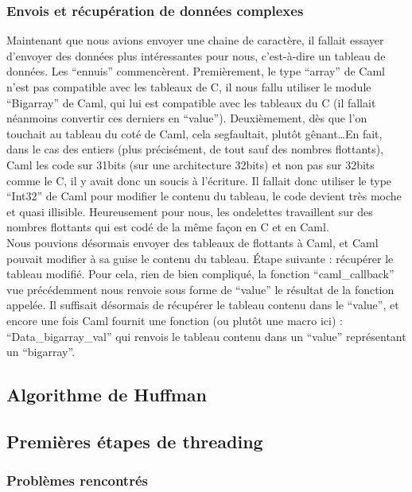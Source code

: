 \documentclass[a4paper,12pt]{article}
\begin{document}
		\subsubsection{Envois et récupération de données complexes}
Maintenant que nous avions envoyer  une chaine de caractère,  il fallait
essayer d'envoyer des données plus intéressantes pour nous, c'est-à-dire
un tableau de  données.  Les ``ennuis'' commencèrent.  Premièrement,  le
type ``array'' de Caml n'est pas  compatible avec les tableaux de C,  il
nous  fallu  utiliser  le  module  ``Bigarray''  de  Caml,  qui  lui est
compatible avec  les tableaux du  C (il fallait  néanmoins convertir ces
derniers en ``value'').  Deuxièmement,  dès que l'on touchait au tableau
du coté de Caml, cela segfaultait,  plutôt gênant\ldots En fait, dans le
cas des entiers (plus précisément,  de tout sauf des nombres flottants),
Caml les  code sur 31bits (sur  une architecture 32bits) et  non pas sur
32bits comme le C,  il y avait  donc un soucis à l'écriture.  Il fallait
donc utiliser  le type  ``Int32'' de  Caml pour  modifier le  contenu du
tableau,  le code  devient très moche  et quasi illisible.  Heureusement
pour nous,  les ondelettes travaillent sur des nombres flottants qui est
codé de la même façon en C et en Caml.\\
Nous pouvions  désormais envoyer des  tableaux de flottants  à Caml,  et
Caml pouvait modifier à sa  guise le contenu du tableau.  Étape suivante
: récupérer le tableau modifié.  Pour cela,  rien de bien compliqué,  la
fonction ``caml\_callback'' vue précédemment  nous renvoie sous forme de
``value'' le résultat de la fonction appelée.  Il suffisait désormais de
récupérer le tableau contenu dans le ``value'',  et encore une fois Caml
fournit une fonction (ou plutôt une macro ici) : ``Data\_bigarray\_val''
qui  renvois  le  tableau  contenu  dans  un  ``value''  représentant un
``bigarray''.

	\subsection{Algorithme de Huffman}

	\subsection{Premières étapes de threading}

		\subsubsection{Problèmes rencontrés}
\end{document}
